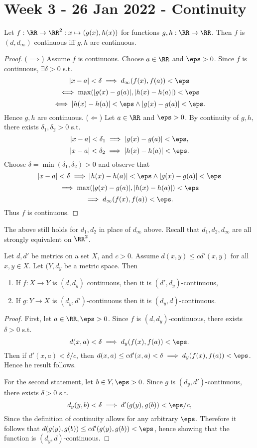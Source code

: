 \section{Week 3 - 26 Jan 2022 - Continuity}
\begin{proposition}
  Let $f:\RR\to\RR^2:x\mapsto (g(x),h(x))$ for functions $g,h:\RR\to\RR$. Then
  $f$ is $(d,d_{\infty})$ continuous iff $g,h$ are continuous.
  \label{<+label+>}
\end{proposition}
\begin{proof}
  ($\implies$) Assume $f$ is continuous. Choose $a\in\RR$ and $\eps>0$. Since
  $f$ is continuous, $\exists\delta>0$ s.t.
  \[|x-a|<\delta \implies d_{\infty}(f(x),f(a))<\eps \]
  \[\iff\max(|g(x)-g(a)|,|h(x)-h(a)|)<\eps \]
  \[\iff |h(x)-h(a)|<\eps \land |g(x)-g(a)|<\eps.\] 
  Hence $g,h$ are continuous.
  ($\Leftarrow$) Let $a\in\RR$ and $\eps>0$. By continuity of $g,h$, there
  exists $\delta_1,\delta_2>0$ s.t.
  \[|x-a|<\delta_1 \implies |g(x)-g(a)|<\eps,\]
  \[|x-a|<\delta_2 \implies |h(x)-h(a)|<\eps.\]
  Choose $\delta=\min(\delta_1,\delta_2)>0$ and observe that 
  \[|x-a|<\delta \implies |h(x)-h(a)|<\eps \land |g(x)-g(a)|<\eps\]
  \[\implies\max(|g(x)-g(a)|,|h(x)-h(a)|)<\eps \]
  \[\implies d_{\infty}(f(x),f(a))<\eps.\]
  Thus $f$ is continuous.
\end{proof}
\begin{remark}
  The above still holds for $d_1,d_2$ in place of $d_{\infty}$ above. Recall
  that $d_1,d_2,d_{\infty}$ are all strongly equivalent on $\RR^2$.
  \label{<+label+>}
\end{remark}
\begin{proposition}
  Let $d,d'$ be metrics on a set $X$, and $c>0$. Assume $d(x,y)\leq cd'(x,y)$ for
  all $x,y\in X$. Let $(Y,d_y$ be a metric space. Then 
    \begin{enumerate}
      \item If $f:X\to Y$ is $(d,d_y)$ continuous, then it is
        $(d',d_y)$-continuous,
      \item If $g:Y\to X$ is $(d_y,d')$-continuous then it is
        $(d_y,d)$-continuous.
    \end{enumerate}
\end{proposition}
\begin{proof}
  First, let $a\in\RR, \eps>0$. Since $f$ is $(d,d_y)$-continuous, there exists
  $\delta>0$ s.t. 
  \[d(x,a)<\delta \implies d_y(f(x),f(a))<\eps.\]
  Then if $d'(x,a)<\delta/c$, then $d(x,a)\leq cd'(x,a)<\delta \implies
  d_y(f(x),f(a))<\eps$. Hence he result follows.

  For the second statement, let $b\in Y, \eps>0$. Since $g$ is
  $(d_y,d')$-continuous, there exists $\delta>0$ s.t. 
  \[d_y(y,b)<\delta \implies d'(g(y), g(b))<\eps/c,\]
  Since the definition of continuity allows for any arbitrary $\eps$. Therefore
  it follows that $d(g(y),g(b))\leq cd'(g(y),g(b)) < \eps$, hence showing that
  the function is $(d_y,d)$-continuous.
\end{proof}

